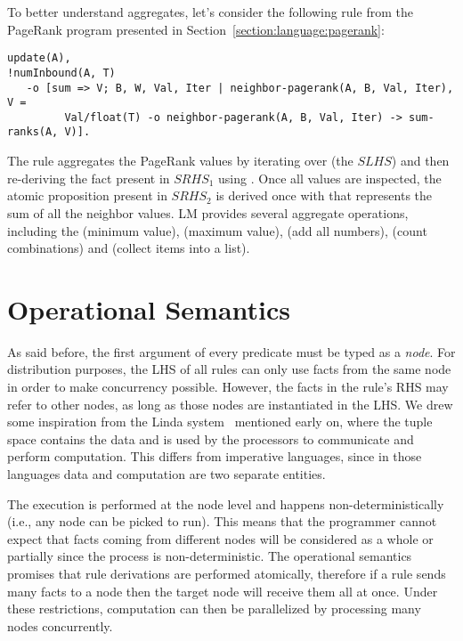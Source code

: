 To better understand aggregates, let's consider the following rule from the
PageRank program presented in Section~\ref{section:language:pagerank}:

\begin{Verbatim}[fontsize=\codesize]
update(A),
!numInbound(A, T)
   -o [sum => V; B, W, Val, Iter | neighbor-pagerank(A, B, Val, Iter), V =
         Val/float(T) -o neighbor-pagerank(A, B, Val, Iter) -> sum-ranks(A, V)].
\end{Verbatim}

The rule aggregates the PageRank values  by iterating over
 (the $SLHS$) and then re-deriving the
fact present in $SRHS_1$ using . Once all
values are inspected, the atomic proposition  present in
$SRHS_2$ is derived once with  that represents the sum of all the
neighbor values. LM provides several aggregate operations, including the
 (minimum value),  (maximum value),  (add all
numbers),  (count combinations) and  (collect items
into a list).

\section{Operational Semantics}

As said before, the first argument of every predicate must be typed as a
\emph{node}.  For distribution purposes, the LHS of all rules can only use facts
from the same node in order to make concurrency possible. However, the facts in
the rule's RHS may refer to other nodes, as long as those nodes are instantiated
in the LHS. We drew some inspiration from the Linda system~\cite{linda}
mentioned early on, where the tuple space contains the data and is used by the
processors to communicate and perform computation. This differs from imperative
languages, since in those languages data and computation are two separate
entities.

The execution is performed at the node level and happens non-deterministically
(i.e., any node can be picked to run). This means that the programmer cannot
expect that facts coming from different nodes will be considered as a whole or
partially since the process is non-deterministic. The operational semantics
promises that rule derivations are performed atomically, therefore if a rule
sends many facts to a node then the target node will receive them all at once.
Under these restrictions, computation can then be parallelized by processing
many nodes concurrently.

